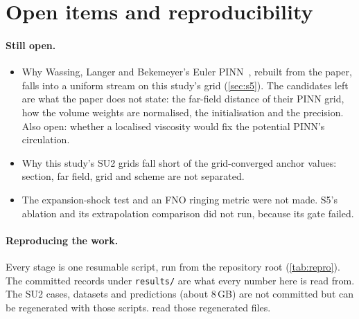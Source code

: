 \documentclass[11pt]{article}
\begin{document}
\section{Open items and reproducibility}
\label{sec:repro}

\paragraph{Still open.}
\begin{itemize}
  \item Why Wassing, Langer and Bekemeyer's Euler PINN~\cite{wassing2025}, rebuilt from the paper,
    falls into a uniform stream on this study's grid (\cref{sec:s5}). The candidates left are what
    the paper does not state: the far-field distance of their PINN grid, how the volume weights
    are normalised, the initialisation and the precision. Also open: whether a localised
    viscosity would fix the potential PINN's circulation.
  \item Why this study's SU2 grids fall short of the grid-converged anchor values: section, far
    field, grid and scheme are not separated.
  \item The expansion-shock test and an FNO ringing metric were not made. S5's ablation and its
    extrapolation comparison did not run, because its gate failed.
\end{itemize}

\paragraph{Reproducing the work.}
Every stage is one resumable script, run from the repository root (\cref{tab:repro}). The
committed records under \texttt{results/} are what every number here is read from. The SU2 cases,
datasets and predictions (about 8\,GB) are not committed but can be regenerated with those scripts.
 read those regenerated files.
\end{document}
